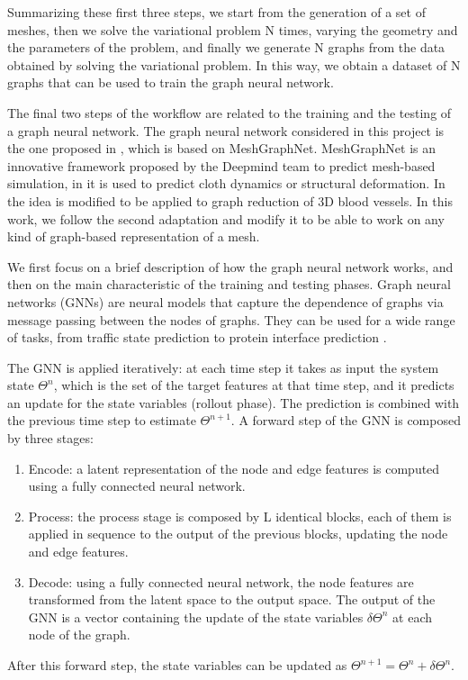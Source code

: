 \documentclass[11pt,a4paper]{article}
\begin{document}
Summarizing these first three steps, we start from the generation of a set of meshes, then we solve the variational problem N times, varying the geometry and the parameters of the problem, and finally we generate N graphs from the data obtained by solving the variational problem. In this way, we obtain a dataset of N graphs that can be used to train the graph neural network. 

The final two steps of the workflow are related to the training and the testing of a graph neural network. 
The graph neural network considered in this project is the one proposed in \cite{Luca}, which is based on MeshGraphNet.
MeshGraphNet is an innovative framework proposed by the Deepmind team to predict mesh-based simulation, in \cite{MeshGraphNet} it is used to predict cloth dynamics or structural deformation. In \cite{Luca} the idea is modified to be applied to graph reduction of 3D blood vessels. In this work, we follow the second adaptation and modify it to be able to work on any kind of graph-based representation of a mesh.

We first focus on a brief description of how the graph neural network works, and then on the main characteristic of the training and testing phases. Graph neural networks (GNNs) are neural models that capture the dependence of graphs via message passing between the nodes of graphs. They can be used for a wide range of tasks, from traffic state prediction to protein interface prediction \cite{Zhou_Cui_Hu_Zhang_Yang_Liu_Wang_Li_Sun_2021}.

The GNN is applied iteratively: at each time step it takes as input the system state \(\Theta^{n}\), which is the set of the target features at that time step, and it predicts an update for the state variables (rollout phase). The prediction is combined with the previous time step to estimate \(\Theta^{n+1}\). 
A forward step of the GNN is composed by three stages:
\begin{enumerate}
    \item Encode: a latent representation of the node and edge features is computed using a fully connected neural network.
    \item Process: the process stage is composed by L identical blocks, each of them is applied in sequence to the output of the previous blocks, updating the node and edge features. 
    \item Decode: using a fully connected neural network, the node features are transformed from the latent space to the output space. The output of the GNN is a vector containing the update of the state variables \(\delta\Theta^n\) at each node of the graph. 
\end{enumerate}
After this forward step, the state variables can be updated as \(\Theta^{n+1} = \Theta^{n} + \delta\Theta^{n}\).
\end{document}
